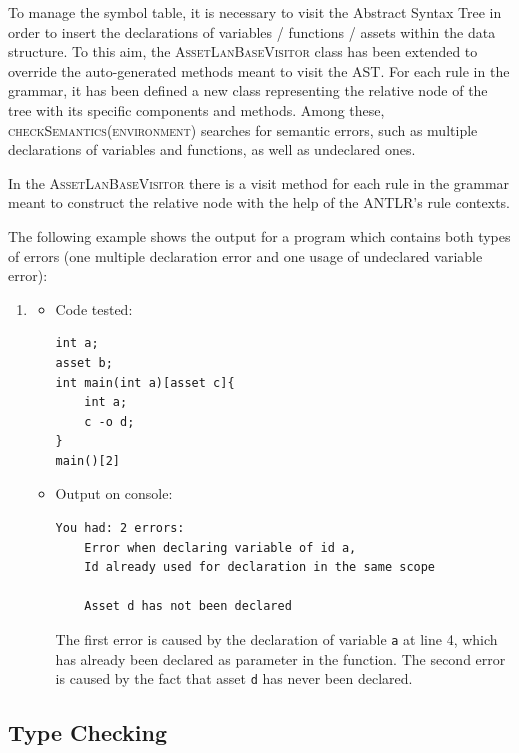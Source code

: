 \documentclass[11pt]{article} %
\begin{document}
\medskip

To manage the symbol table, it is necessary to visit the Abstract Syntax Tree in order to insert the declarations of variables / functions / assets within the data structure. To this aim, the \textsc{AssetLanBaseVisitor} class has been extended to override the auto-generated methods meant to visit the AST. For each rule in the grammar, it has been defined a new class representing the relative node of the tree with its specific components and methods. Among these, \textsc{checkSemantics(environment)} searches for semantic errors, such as multiple declarations of variables and functions, as well as undeclared ones.

\medskip

In the \textsc{AssetLanBaseVisitor} there is a visit method for each rule in the grammar meant to construct the relative node with the help of the ANTLR's rule contexts. 

\medskip

The following example shows the output for a program which contains both types of errors (one multiple declaration error and one usage of undeclared variable error):

\begin{enumerate}
\item
	\begin{itemize}
		\item Code tested: \begin{lstlisting}
int a;
asset b;
int main(int a)[asset c]{
    int a;
    c -o d;
}
main()[2]
		\end{lstlisting}
		\item Output on console: \begin{lstlisting}
You had: 2 errors:
	Error when declaring variable of id a,
	Id already used for declaration in the same scope
	
	Asset d has not been declared
		\end{lstlisting}
		
	The first error is caused by the declaration of variable \verb|a| at line 4, which has already been declared as parameter in the function.
	The second error is caused by the fact that asset \verb|d| has never been declared.
	\end{itemize}
\end{enumerate}

\subsection{Type Checking}
\end{document}
